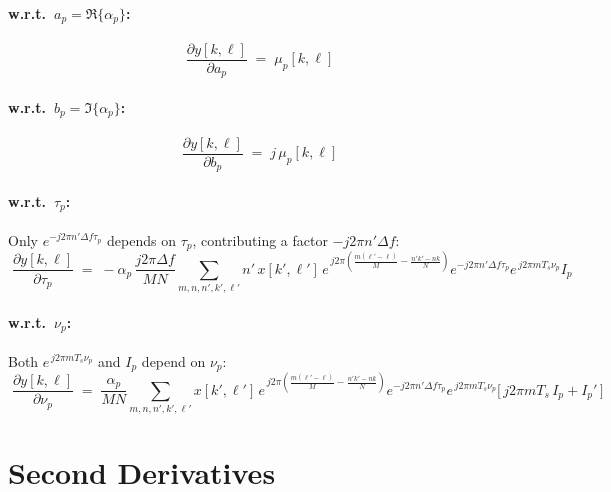 \documentclass[11pt]{article}
\begin{document}
\paragraph{w.r.t.\ $a_p = \Re\{\alpha_p\}$:}
\begin{equation}
  \boxed{\;
  \frac{\partial y[k,\ell]}{\partial a_p}
  \;=\; \mu_p[k,\ell]
  \;}
\end{equation}

\paragraph{w.r.t.\ $b_p = \Im\{\alpha_p\}$:}
\begin{equation}
  \boxed{\;
  \frac{\partial y[k,\ell]}{\partial b_p}
  \;=\; j\,\mu_p[k,\ell]
  \;}
\end{equation}

\paragraph{w.r.t.\ $\tau_p$:}
Only $e^{-j2\pi n'\Delta f\tau_p}$ depends on $\tau_p$, contributing a
factor $-j2\pi n'\Delta f$:
\begin{equation}
  \boxed{\;
  \frac{\partial y[k,\ell]}{\partial \tau_p}
  \;=\; -\alpha_p\,\frac{j2\pi\Delta f}{MN}
        \sum_{m,n,n',k',\ell'} n'\,
        x[k',\ell']\,
        e^{\,j2\pi\!\left(\frac{m(\ell'-\ell)}{M}-\frac{n'k'-nk}{N}\right)}
        e^{-j2\pi n'\Delta f\tau_p}
        e^{\,j2\pi m T_s\nu_p}
        I_p
  \;}
\end{equation}

\paragraph{w.r.t.\ $\nu_p$:}
Both $e^{\,j2\pi m T_s\nu_p}$ and $I_p$ depend on $\nu_p$:
\begin{equation}
  \boxed{\;
  \frac{\partial y[k,\ell]}{\partial \nu_p}
  \;=\; \frac{\alpha_p}{MN}
        \sum_{m,n,n',k',\ell'}
        x[k',\ell']\,
        e^{\,j2\pi\!\left(\frac{m(\ell'-\ell)}{M}-\frac{n'k'-nk}{N}\right)}
        e^{-j2\pi n'\Delta f\tau_p}
        e^{\,j2\pi m T_s\nu_p}
        \bigl[\,j2\pi m T_s\,I_p + I_p'\,\bigr]
  \;}
\end{equation}

\section*{Second Derivatives}
\end{document}
